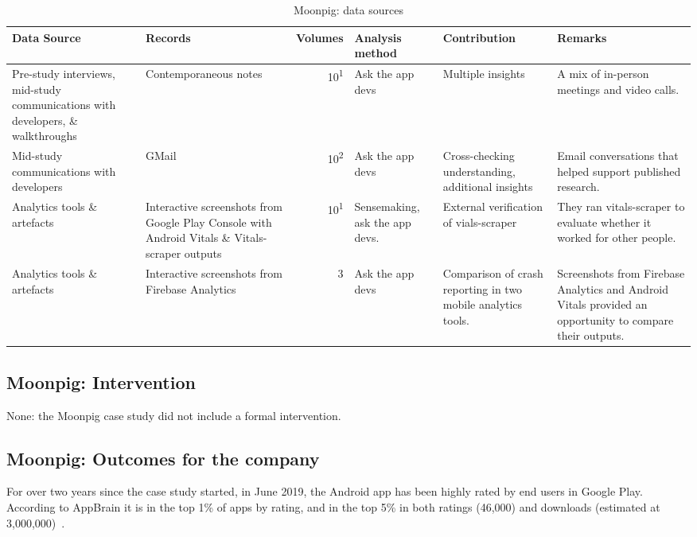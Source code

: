 \begin{table}
    \centering
    \footnotesize
    \tabcolsep=0.12cm
    \begin{tabular}{p{2.6cm}p{2.9cm}r>{\raggedright}p{2.1cm}>{\raggedright\arraybackslash}p{2.5cm}>{\raggedright\arraybackslash}p{3cm}}
        Data Source & Records & Volumes & Analysis method & Contribution & Remarks \\
        \toprule
         Pre-study interviews, mid-study communications with developers, \& walkthroughs & Contemporaneous notes & 10\textsuperscript{1} & Ask the app devs & Multiple insights & A mix of in-person meetings and video calls.  \\
         Mid-study communications with developers & GMail & 10\textsuperscript{2} & Ask the app devs & Cross-checking understanding, additional insights & Email conversations that helped support published research. \\
         Analytics tools \& artefacts &Interactive screenshots from Google Play Console with Android Vitals \& Vitals-scraper outputs &10\textsuperscript{1} & Sensemaking, ask the app devs. & External verification of vials-scraper & They ran vitals-scraper to evaluate whether it worked for other people. \\
         Analytics tools \& artefacts & Interactive screenshots from Firebase Analytics & 3 & Ask the app devs & Comparison of crash reporting in two mobile analytics tools. & Screenshots from Firebase Analytics and Android Vitals provided an opportunity to compare their outputs. \\
         \bottomrule
    \end{tabular}
    \caption{Moonpig: data sources}
    \label{tab:moonpig-data-sources}
\end{table}


\subsection{Moonpig: Intervention}
None: the Moonpig case study did not include a formal intervention.

\subsection{Moonpig: Outcomes for the company}
For over two years since the case study started, in June 2019, the Android app has been highly rated by end users in Google Play. According to AppBrain it is in the top 1\% of apps by rating, and in the top 5\% in both ratings (46,000) and downloads (estimated at 3,000,000)~\citep{appbrain_moonpig}.

